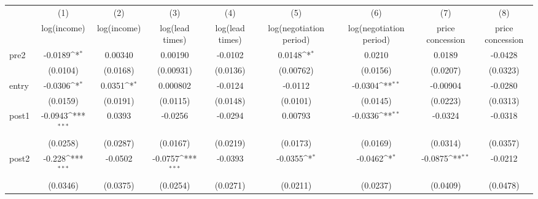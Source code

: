 {
\def\sym#1{\ifmmode^{#1}\else\(^{#1}\)\fi}
\begin{tabular}{l*{8}{c}}
\toprule
            &\multicolumn{1}{c}{(1)}&\multicolumn{1}{c}{(2)}&\multicolumn{1}{c}{(3)}&\multicolumn{1}{c}{(4)}&\multicolumn{1}{c}{(5)}&\multicolumn{1}{c}{(6)}&\multicolumn{1}{c}{(7)}&\multicolumn{1}{c}{(8)}\\
            &\multicolumn{1}{c}{log(income)}&\multicolumn{1}{c}{log(income)}&\multicolumn{1}{c}{log(lead times)}&\multicolumn{1}{c}{log(lead times)}&\multicolumn{1}{c}{log(negotiation period)}&\multicolumn{1}{c}{log(negotiation period)}&\multicolumn{1}{c}{price concession}&\multicolumn{1}{c}{price concession}\\
\midrule
pre2        &     -0.0189\sym{*}  &     0.00340         &     0.00190         &     -0.0102         &      0.0148\sym{*}  &      0.0210         &      0.0189         &     -0.0428         \\
            &    (0.0104)         &    (0.0168)         &   (0.00931)         &    (0.0136)         &   (0.00762)         &    (0.0156)         &    (0.0207)         &    (0.0323)         \\
\addlinespace
entry       &     -0.0306\sym{*}  &      0.0351\sym{*}  &    0.000802         &     -0.0124         &     -0.0112         &     -0.0304\sym{**} &    -0.00904         &     -0.0280         \\
            &    (0.0159)         &    (0.0191)         &    (0.0115)         &    (0.0148)         &    (0.0101)         &    (0.0145)         &    (0.0223)         &    (0.0313)         \\
\addlinespace
post1       &     -0.0943\sym{***}&      0.0393         &     -0.0256         &     -0.0294         &     0.00793         &     -0.0336\sym{**} &     -0.0324         &     -0.0318         \\
            &    (0.0258)         &    (0.0287)         &    (0.0167)         &    (0.0219)         &    (0.0173)         &    (0.0169)         &    (0.0314)         &    (0.0357)         \\
\addlinespace
post2       &      -0.228\sym{***}&     -0.0502         &     -0.0757\sym{***}&     -0.0393         &     -0.0355\sym{*}  &     -0.0462\sym{*}  &     -0.0875\sym{**} &     -0.0212         \\
            &    (0.0346)         &    (0.0375)         &    (0.0254)         &    (0.0271)         &    (0.0211)         &    (0.0237)         &    (0.0409)         &    (0.0478)         \\

\end{tabular}}
